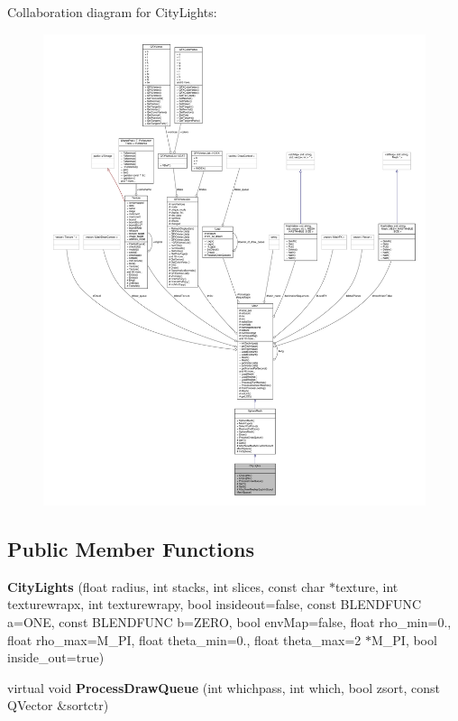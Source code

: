 Collaboration diagram for City\+Lights\+:
\nopagebreak
\begin{figure}[H]
\begin{center}
\leavevmode
\includegraphics[width=350pt]{d5/d21/classCityLights__coll__graph}
\end{center}
\end{figure}
\subsection*{Public Member Functions}
\begin{DoxyCompactItemize}
\item 
{\bfseries City\+Lights} (float radius, int stacks, int slices, const char $\ast$texture, int texturewrapx, int texturewrapy, bool insideout=false, const B\+L\+E\+N\+D\+F\+U\+NC a=O\+NE, const B\+L\+E\+N\+D\+F\+U\+NC b=Z\+E\+RO, bool env\+Map=false, float rho\+\_\+min=0., float rho\+\_\+max=M\+\_\+\+PI, float theta\+\_\+min=0., float theta\+\_\+max=2 $\ast$M\+\_\+\+PI, bool inside\+\_\+out=true)\hypertarget{classCityLights_a372fb6cead57b50034ada1be4e4221a0}{}\label{classCityLights_a372fb6cead57b50034ada1be4e4221a0}

\item 
virtual void {\bfseries Process\+Draw\+Queue} (int whichpass, int which, bool zsort, const Q\+Vector \&sortctr)\hypertarget{classCityLights_a9e0a4271783bdae188bbc1192a387610}{}\label{classCityLights_a9e0a4271783bdae188bbc1192a387610}

\end{DoxyCompactItemize}
